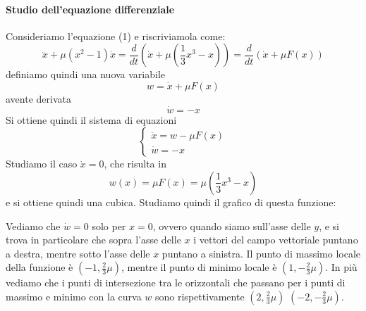 \documentclass[12pt]{article}
\begin{document}
\paragraph{Studio dell'equazione differenziale \\}
Consideriamo l'equazione (1) e riscriviamola come:
\begin{equation}
	\ddot{x}+\mu(x^2-1)\dot{x} = \frac{d}{dt}\left(\dot{x}+\mu\left(\frac{1}{3}x^3-x\right)\right) = \frac{d}{dt}\left(\dot{x} + \mu F(x)\right)
\end{equation}
definiamo quindi una nuova variabile
\begin{equation}
	w = \dot{x} + \mu F(x)
\end{equation}
avente derivata 
$$
	\dot{w} = -x
$$
Si ottiene quindi il sistema di equazioni
\begin{equation}
	\begin{cases}
		\dot{x} = w - \mu F(x) \\
		\dot{w} = -x
	\end{cases}
\end{equation}
Studiamo il caso $\dot{x} = 0$, che risulta in
\begin{equation}
	w(x) = \mu F(x) = \mu\left(\frac{1}{3}x^3-x\right)
\end{equation}
e si ottiene quindi una cubica. Studiamo quindi il grafico di questa funzione: 
\begin{center}
\end{center}
Vediamo che $\dot{w} = 0$ solo per $x=0$, ovvero quando siamo sull'asse delle $y$, e si trova in particolare che sopra l'asse delle $x$ i vettori del campo vettoriale puntano a destra, mentre sotto l'asse delle $x$ puntano a sinistra. Il punto di massimo locale della funzione è $\left(-1,\frac{2}{3}\mu\right)$, mentre il punto di minimo locale è $\left(1,-\frac{2}{3}\mu\right)$. In più vediamo che i punti di intersezione tra le orizzontali che passano per i punti di massimo e minimo con la curva $w$ sono rispettivamente $\left(2,\frac{2}{3}\mu\right)$ $\left(-2,-\frac{2}{3}\mu\right)$. \\
\end{document}
